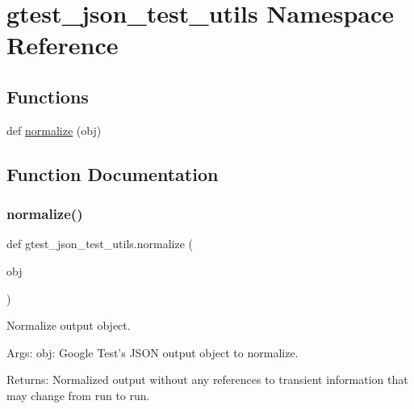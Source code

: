 \hypertarget{namespacegtest__json__test__utils}{}\section{gtest\+\_\+json\+\_\+test\+\_\+utils Namespace Reference}
\label{namespacegtest__json__test__utils}
\subsection*{Functions}
\begin{DoxyCompactItemize}
\item 
def \mbox{\hyperlink{namespacegtest__json__test__utils_a339ba380c6799ecba1a9c9b396020573}{normalize}} (obj)
\end{DoxyCompactItemize}


\subsection{Function Documentation}
\mbox{\label{namespacegtest__json__test__utils_a339ba380c6799ecba1a9c9b396020573}} 
\subsubsection{\texorpdfstring{normalize()}{normalize()}}
{\footnotesize\ttfamily def gtest\+\_\+json\+\_\+test\+\_\+utils.\+normalize (\begin{DoxyParamCaption}\item[{}]{obj }\end{DoxyParamCaption})}

\begin{DoxyVerb}Normalize output object.

Args:
   obj: Google Test's JSON output object to normalize.

Returns:
   Normalized output without any references to transient information that may
   change from run to run.
\end{DoxyVerb}
 
